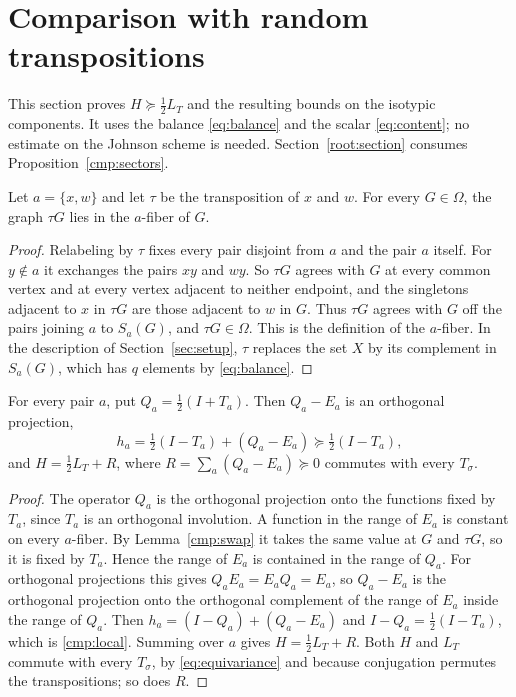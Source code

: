 \section{Comparison with random transpositions}\label{cmp:section}
This section proves $H\succeq\tfrac12L_T$ and the resulting bounds on the
isotypic components. It uses the balance
\eqref{eq:balance} and the scalar \eqref{eq:content}; no estimate on the
Johnson scheme is needed. Section~\ref{root:section} consumes
Proposition~\ref{cmp:sectors}.

\begin{lemma}\label{cmp:swap}
Let $a=\{x,w\}$ and let $\tau$ be the transposition of $x$ and $w$. For every
$G\in\Omega$, the graph $\tau G$ lies in the $a$-fiber of $G$.
\end{lemma}

\begin{proof}
Relabeling by $\tau$ fixes every pair disjoint from $a$ and the pair $a$
itself. For $y\notin a$ it exchanges the pairs $xy$ and $wy$. So $\tau G$
agrees with $G$ at every common vertex and at every vertex adjacent to
neither endpoint, and the singletons adjacent to $x$ in $\tau G$ are those
adjacent to $w$ in $G$. Thus $\tau G$ agrees with $G$ off the pairs joining
$a$ to $S_a(G)$, and $\tau G\in\Omega$. This is the definition of the
$a$-fiber. In the description of Section~\ref{sec:setup}, $\tau$ replaces the
set $X$ by its complement in $S_a(G)$, which has $q$ elements by
\eqref{eq:balance}.
\end{proof}

\begin{proposition}\label{cmp:main}
For every pair $a$, put $Q_a=\tfrac12(I+T_a)$. Then $Q_a-E_a$ is an orthogonal
projection,
\begin{equation}\label{cmp:local}
 h_a=\tfrac12(I-T_a)+(Q_a-E_a)\succeq\tfrac12(I-T_a),
\end{equation}
and $H=\tfrac12L_T+R$, where $R=\sum_a(Q_a-E_a)\succeq0$ commutes with every
$T_\sigma$.
\end{proposition}

\begin{proof}
The operator $Q_a$ is the orthogonal projection onto the functions fixed by
$T_a$, since $T_a$ is an orthogonal involution. A function in the range of
$E_a$ is constant on every $a$-fiber. By Lemma~\ref{cmp:swap} it takes the
same value at $G$ and $\tau G$, so it is fixed by $T_a$. Hence the range of
$E_a$ is contained in the range of $Q_a$. For orthogonal projections this
gives $Q_aE_a=E_aQ_a=E_a$, so $Q_a-E_a$ is the orthogonal projection onto the
orthogonal complement of the range of $E_a$ inside the range of $Q_a$.
Then $h_a=(I-Q_a)+(Q_a-E_a)$ and $I-Q_a=\tfrac12(I-T_a)$, which is
\eqref{cmp:local}. Summing over $a$ gives $H=\tfrac12L_T+R$. Both $H$ and
$L_T$ commute with every $T_\sigma$, by \eqref{eq:equivariance} and because
conjugation permutes the transpositions; so does $R$.
\end{proof}

